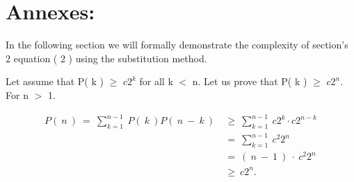 \section{Annexes:}

In the following section we will formally demonstrate the complexity of section's 2 equation ( 2 ) using the substitution method. \hfill \break

\begin{flushleft}
{\bfseries\itshape\color{carmine}{Solution:}}
\end{flushleft} \hfill

Let assume that P( k ) $\geq$ $c2^{k}$ for all k $<$ n. Let us prove that P( k ) $\geq$ $c2^{n}$. For n $>$ 1. \hfill \break

\begin{ceqn}
\begin{align*}
P(\ n\ )\ =\ \sum_{k = 1}^{n - 1}\ P(\ k\ )P(\ n\ -\ k\ )\ &\geq\ \sum_{k = 1}^{n - 1}\ c2^{k} \cdot c2^{n-k} \\
&=\ \sum_{k = 1}^{n - 1}\ c^{2}2^{n} \\
&=\ (\ n\ -\ 1\ )\ \cdot\ c^{2}2^{n} \\
&\geq\ c2^{n}.
\end{align*}
\end{ceqn} \hfill

{\bfseries\itshape\color{airforceblue}{Note:}} {\itshape{}} \hfill \break

\begin{center}
{\bfseries\itshape\color{carmine}{Finally:}} {\itshape{}}
\end{center}

\pagebreak